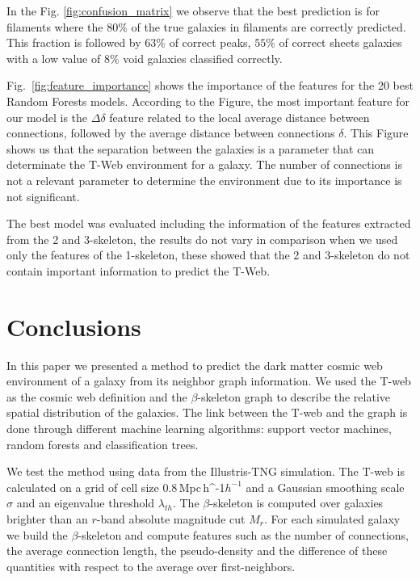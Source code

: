 \documentclass[usenatbib]{mnras}
\newcommand{\Mpch}{\,{\rm Mpc}\,\ifmmode h^{-1}\else $h^{-1}$\fi}
\begin{document}
In the Fig. \ref{fig:confusion_matrix} we observe that the best prediction is for filaments where the $80\%$ of the true galaxies in filaments are correctly predicted. 
This fraction is followed by $63\%$ of correct peaks, $55\%$ of
correct   sheets galaxies with a low value of $8\%$ void galaxies
classified correctly. 

Fig.~\ref{fig:feature_importance} shows the importance of the features
for the 20 best Random Forests models. According to the Figure, the
most important feature for our model is the $\Delta \delta$ feature
related to the local average distance between connections, followed by
the average distance between connections $\delta$. This Figure shows
us that the separation between the galaxies is a parameter that can
determinate the T-Web environment for a galaxy. The number of
connections is not a relevant parameter to determine the environment
due to its importance is not significant. 

The best model was evaluated including the information of the features
extracted from the 2 and 3-skeleton, the results do not vary in
comparison when we used only the features of the 1-skeleton, these
showed that the 2 and 3-skeleton do not contain important information
to predict the T-Web. 


\section{Conclusions}\label{sec:conclusions}

In this paper we presented a method to predict the dark matter cosmic web
environment of a galaxy from its neighbor graph information.
We used the T-web as the cosmic web definition \citep{Forero-Romero2009}
and the $\beta$-skeleton graph \citep{Fang2019} 
to describe the relative spatial distribution of the galaxies. 
The link between the T-web and the graph is done through different
machine learning algorithms: support vector machines, random forests and
classification trees.

We test the method using data from the Illustris-TNG simulation.
The T-web is calculated on a grid of cell size $0.8$\Mpch 
and a Gaussian smoothing scale $\sigma$ and an eigenvalue threshold $\lambda_{th}$.
The $\beta$-skeleton is computed over galaxies brighter than 
an $r$-band absolute magnitude cut $M_{r}$.
For each simulated galaxy we build the $\beta$-skeleton and
compute features such as the number of connections, the average connection
length, the pseudo-density and the difference of these quantities with
respect to the average over first-neighbors.
\end{document}
